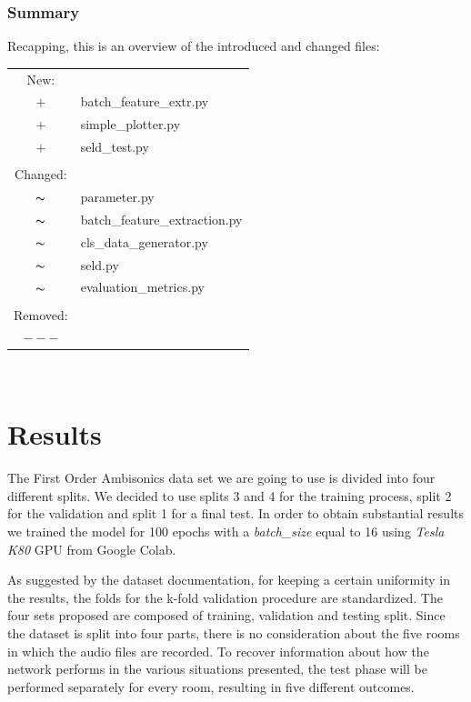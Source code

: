 \documentclass[11pt]{article}
\begin{document}
\subsubsection{Summary}

Recapping, this is an overview of the introduced and changed files:

\begin{tabular}{cp{}}
  New:\\  
  $+$ & batch\_feature\_extr.py \\
  $+$ & simple\_plotter.py \\
  $+$ & seld\_test.py \\
  \\
  Changed:\\
  $\thicksim$ & parameter.py\\
  $\thicksim$ & batch\_feature\_extraction.py\\
  $\thicksim$ & cls\_data\_generator.py\\
  $\thicksim$ & seld.py\\
  $\thicksim$ & evaluation\_metrics.py\\
  \\
  Removed:\\
  $---$ 
\end{tabular}\\


\newpage
\section{Results}\label{cha:res}

The First Order Ambisonics data set we are going to use is divided into four different splits. We decided to use splits 3 and 4 for the training process, split 2 for the validation and split 1 for a final test. In order to obtain substantial results we trained the model for 100 epochs with a \textit{batch\_size} equal to 16 using \textit{Tesla K80} GPU from Google Colab.

\noindent
As suggested by the dataset documentation, for keeping a certain uniformity in the results, the folds for the k-fold validation procedure are standardized. The four sets proposed are composed of training, validation and testing split. 
Since the dataset is split into four parts, there is no consideration about the five rooms in which the audio files are recorded. 
To recover information about how the network performs in the various situations presented, the test phase will be performed separately for every room, resulting in five different outcomes.
\end{document}
